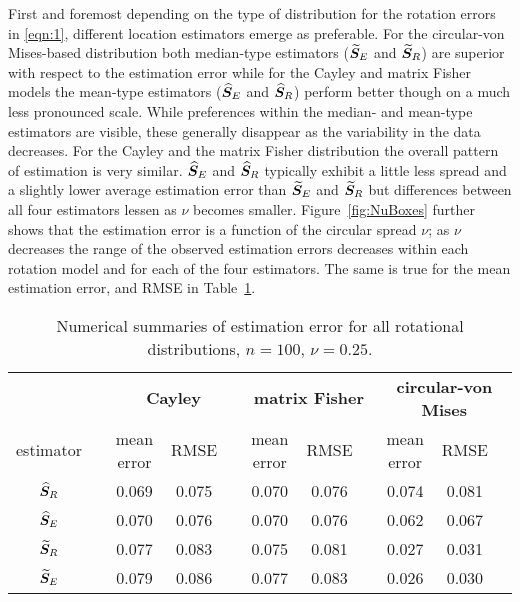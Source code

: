 First and foremost depending on the type of distribution for the rotation errors in \eqref{eqn:1}, different location estimators emerge as preferable.  For the circular-von Mises-based distribution both median-type estimators (${\widetilde{\bm S}_E}$ and ${\widetilde{\bm S}_R}$) are superior with respect to the estimation error while for the Cayley and matrix Fisher models the mean-type estimators (${\widehat{\bm S}_E}$ and ${\widehat{\bm S}_R}$) perform better though on a much less pronounced scale. While preferences within the median- and mean-type estimators are visible, these generally disappear as the variability in the data decreases.    
For the Cayley and the matrix Fisher distribution the overall pattern of estimation is very similar. ${\widehat{\bm S}_E}$ and ${\widehat{\bm S}_R}$ typically exhibit a little less spread and a slightly lower average estimation error than ${\widetilde{\bm S}_E}$ and ${\widetilde{\bm S}_R}$ but differences between all four estimators lessen as $\nu$ becomes smaller. Figure~\ref{fig:NuBoxes} further shows that the estimation error is a function of the circular spread $\nu$; as $\nu$ decreases the range of the observed estimation errors decreases within each rotation model and for each of the four estimators. The same is true for the mean estimation error, and RMSE in Table~\ref{tab:alldN100Nu25}.  

 \begin{table}[h!]
 \caption{Numerical summaries of estimation error for all rotational distributions, $n=100$,  $\nu=0.25$.  \label{tab:alldN100Nu25}}
\begin{center}
\begin{tabular}{ccccccccccc}
  \hline
		& &\multicolumn{3}{c}{\textbf{Cayley}} & \multicolumn{3}{c}{\textbf{matrix Fisher}}  & \multicolumn{3}{c}{\textbf{circular-von Mises}}\\ 
estimator 	& &  mean error & RMSE& &  mean error & RMSE& &   mean error & RMSE \\  \hline \hline %
 		  ${\widehat{\bm S}_R}$ & &  0.069 & 0.075 & &  0.070 & 0.076&  & 0.074 & 0.081 \\ 
 		 ${\widehat{\bm S}_E}$ &  & 0.070 & 0.076 & &  0.070 & 0.076&  &  0.062 & 0.067\\ 
		 ${\widetilde{\bm S}_R}$ &  & 0.077 & 0.083 & &  0.075 & 0.081&  & 0.027 & 0.031\\ 
 		  ${\widetilde{\bm S}_E}$ &  & 0.079 & 0.086 & &  0.077 & 0.083 & & 0.026 & 0.030\\ \hline
\end{tabular}
\end{center}
\end{table}



